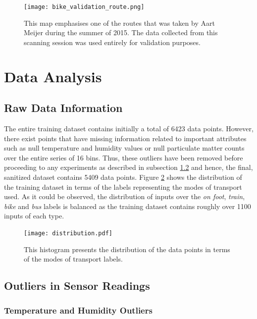 \documentclass[bsc,frontabs,twoside,singlespacing, parskip,deptreport]{infthesis}     %
\begin{document}
\begin{figure}[h!]
  \center
  \texttt{[image: bike\_validation\_route.png]} 
  \caption{This map emphasises one of the routes that was taken by Aart Meijer during the summer of 2015. The data collected from this scanning session was used entirely for validation purposes.}
  \label{fig:bike-validation-route}
\end{figure}

\section{Data Analysis}
\label{sec:data-analysis}

\subsection{Raw Data Information}

The entire training dataset contains initially a total of 6423 data points. However, there exist points that have missing information related to important attributes such as null temperature and humidity values or null particulate matter counts over the entire series of 16 bins. Thus, these outliers have been removed before proceeding to any experiments as described in subsection \ref{subsec:outlier-removal} and hence, the final, sanitized dataset contains 5409 data points. Figure \ref{fig:distribution} shows the distribution of the training dataset in terms of the labels representing the modes of transport used. As it could be observed, the distribution of inputs over the \textit{on foot}, \textit{train}, \textit{bike} and \textit{bus} labels is balanced as the training dataset contains roughly over 1100 inputs of each type.

\begin{figure}[h!]
  \center
  \texttt{[image: distribution.pdf]}
  \caption{This histogram presents the distribution of the data points in terms of the modes of transport labels.}
  \label{fig:distribution}
\end{figure}


\subsection{Outliers in Sensor Readings}
\label{subsec:outlier-removal}

\subsubsection*{Temperature and Humidity Outliers}
\end{document}
